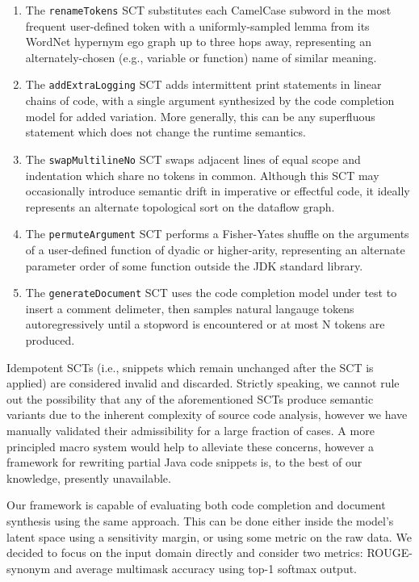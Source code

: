 \documentclass[sigconf,review,anonymous]{acmart}
\begin{document}
  \begin{enumerate}
    \item The \lstinline|renameTokens| SCT substitutes each CamelCase subword in the most frequent user-defined token with a uniformly-sampled lemma from its WordNet hypernym ego graph up to three hops away, representing an alternately-chosen (e.g., variable or function) name of similar meaning.
    \item The \lstinline|addExtraLogging| SCT adds intermittent print statements in linear chains of code, with a single argument synthesized by the code completion model for added variation. More generally, this can be any superfluous statement which does not change the runtime semantics.
    \item The \lstinline|swapMultilineNo| SCT swaps adjacent lines of equal scope and indentation which share no tokens in common. Although this SCT may occasionally introduce semantic drift in imperative or effectful code, it ideally represents an alternate topological sort on the dataflow graph.
    \item The \lstinline|permuteArgument| SCT performs a Fisher-Yates shuffle on the arguments of a user-defined function of dyadic or higher-arity, representing an alternate parameter order of some function outside the JDK standard library.
    \item The \lstinline|generateDocument| SCT uses the code completion model under test to insert a comment delimeter, then samples natural langauge tokens autoregressively until a stopword is encountered or at most N tokens are produced.
  \end{enumerate}

  Idempotent SCTs (i.e., snippets which remain unchanged after the SCT is applied) are considered invalid and discarded. Strictly speaking, we cannot rule out the possibility that any of the aforementioned SCTs produce semantic variants due to the inherent complexity of source code analysis, however we have manually validated their admissibility for a large fraction of cases. A more principled macro system would help to alleviate these concerns, however a framework for rewriting partial Java code snippets is, to the best of our knowledge, presently unavailable.


  Our framework is capable of evaluating both code completion and document synthesis using the same approach. This can be done either inside the model's latent space using a sensitivity margin, or using some metric on the raw data. We decided to focus on the input domain directly and consider two metrics: ROUGE-synonym and average multimask accuracy using top-1 softmax output.
\end{document}
